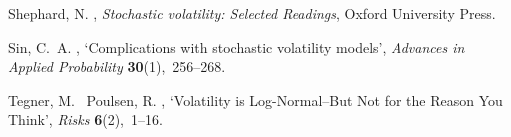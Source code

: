 \documentclass[pdftex,11pt,a4paper] {article}
\begin{document}
\begin{thebibliography}{}
	
Shephard, N.  \harvardyearright , {\em Stochastic
  volatility: Selected Readings}, Oxford University Press.

Sin, C.~A.  \harvardyearright , `Complications with
  stochastic volatility models', {\em Advances in Applied Probability} {\bf
  30}(1),~256--268.
 

Tegner, M. \harvardand\ Poulsen, R. \harvardyearright, `Volatility is Log-Normal--But Not for the Reason You Think',  {\em Risks} {\bf 6}(2),~1--16.


\end{thebibliography}
\end{document}
